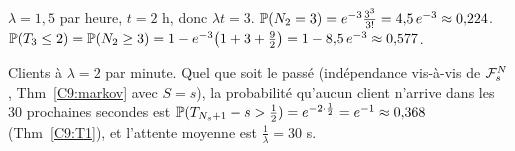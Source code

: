 \documentclass[11pt,a4paper]{article}
\begin{document}
\begin{exemple}\label{C9:ex1}
$\lambda=1{,}5$ par heure, $t=2$ h, donc $\lambda t=3$. $\mathbb{P}(N_2=3)=e^{-3}\frac{3^3}{3!}=4{,}5\,e^{-3}\approx0{,}224$.
$\mathbb{P}(T_3\le2)=\mathbb{P}(N_2\ge3)=1-e^{-3}\bigl(1+3+\frac92\bigr)=1-8{,}5\,e^{-3}\approx0{,}577$.
\end{exemple}

\begin{exemple}\label{C9:ex2}
Clients à $\lambda=2$ par minute. Quel que soit le passé (indépendance vis-à-vis de $\mathcal{F}^N_s$, Thm~\ref{C9:markov} avec $S=s$), la probabilité qu'aucun client n'arrive dans les 30 prochaines secondes est
$\mathbb{P}(T_{N_s+1}-s>\frac12)=e^{-2\cdot\frac12}=e^{-1}\approx0{,}368$ (Thm~\ref{C9:T1}), et l'attente moyenne est $\frac1\lambda=30$ s.
\end{exemple}
\end{document}
